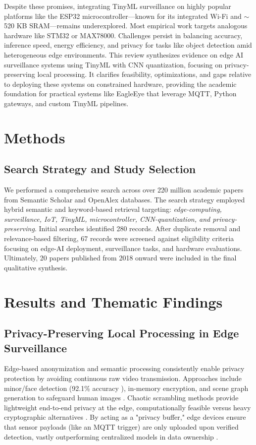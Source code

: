 \documentclass[12pt, a4paper]{article}
\begin{document}
Despite these promises, integrating TinyML surveillance on highly popular platforms like the ESP32 microcontroller---known for its integrated Wi-Fi and $\sim$520 KB SRAM---remains underexplored. Most empirical work targets analogous hardware like STM32 or MAX78000. Challenges persist in balancing accuracy, inference speed, energy efficiency, and privacy for tasks like object detection amid heterogeneous edge environments. This review synthesizes evidence on edge AI surveillance systems using TinyML with CNN quantization, focusing on privacy-preserving local processing. It clarifies feasibility, optimizations, and gaps relative to deploying these systems on constrained hardware, providing the academic foundation for practical systems like EagleEye that leverage MQTT, Python gateways, and custom TinyML pipelines.

\section{Methods}
\subsection{Search Strategy and Study Selection}
We performed a comprehensive search across over 220 million academic papers from Semantic Scholar and OpenAlex databases. The search strategy employed hybrid semantic and keyword-based retrieval targeting: \textit{edge-computing, surveillance, IoT, TinyML, microcontroller, CNN-quantization, and privacy-preserving}. Initial searches identified 280 records. After duplicate removal and relevance-based filtering, 67 records were screened against eligibility criteria focusing on edge-AI deployment, surveillance tasks, and hardware evaluations. Ultimately, 20 papers published from 2018 onward were included in the final qualitative synthesis.

\section{Results and Thematic Findings}

\subsection{Privacy-Preserving Local Processing in Edge Surveillance}
Edge-based anonymization and semantic processing consistently enable privacy protection by avoiding continuous raw video transmission. Approaches include minor/face detection (92.1\% accuracy \cite{yuan2020}), in-memory encryption, and scene graph generation to safeguard human images \cite{myneni2022, huang2023}. Chaotic scrambling methods provide lightweight end-to-end privacy at the edge, computationally feasible versus heavy cryptographic alternatives \cite{fitwi2021}. By acting as a "privacy buffer," edge devices ensure that sensor payloads (like an MQTT trigger) are only uploaded upon verified detection, vastly outperforming centralized models in data ownership \cite{myneni2022}.
\end{document}
